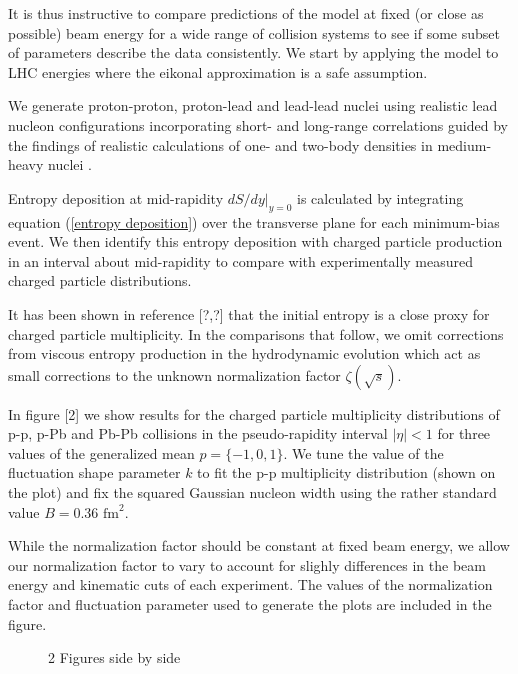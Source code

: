 \documentclass[aps,prl,reprint,amsmath,nofootinbib]{revtex4-1}
\begin{document}
It is thus instructive to compare predictions of the model at fixed (or close as possible) beam energy for a wide range of collision systems to see if 
some subset of parameters describe the data consistently. We start by applying the model to LHC energies where the eikonal approximation is a safe assumption.

We generate proton-proton, proton-lead and lead-lead nuclei using realistic lead nucleon configurations incorporating short- and long-range correlations guided 
by the findings of realistic calculations of one- and two-body densities in medium-heavy nuclei \cite{nucleon-correlations}. 

Entropy deposition at mid-rapidity $dS/dy |_{y=0}$ is calculated by integrating equation (\ref{entropy deposition}) over the transverse plane for each minimum-bias
event. We then identify this entropy deposition with charged particle production in an interval about mid-rapidity to compare with experimentally measured
charged particle distributions. 

It has been shown in reference [?,?] that the initial entropy is a close proxy for charged particle multiplicity. In the comparisons that follow, we omit 
corrections from viscous entropy production in the hydrodynamic evolution which act as small corrections to the unknown normalization factor $\zeta(\sqrt{s})$.

In figure [2] we show results for the charged particle multiplicity distributions of p-p, p-Pb and Pb-Pb collisions in the pseudo-rapidity interval $|\eta|<1$ for three
values of the generalized mean $p=\{-1,0,1\}$. We tune the value of the fluctuation shape parameter $k$ to fit the p-p multiplicity distribution (shown on the plot) and 
fix the squared Gaussian nucleon width using the rather standard value $B=0.36$ $\mbox{fm}^2$. 

While the normalization factor should be constant at fixed beam energy, 
we allow our normalization factor to vary to account for slighly differences in the beam energy and kinematic cuts of each experiment. The values of the normalization
factor and fluctuation parameter used to generate the plots are included in the figure.
\begin{figure*}[t]
    \centering
    \caption{2 Figures side by side}
    \label{fig:example}
\end{figure*}
\end{document}
